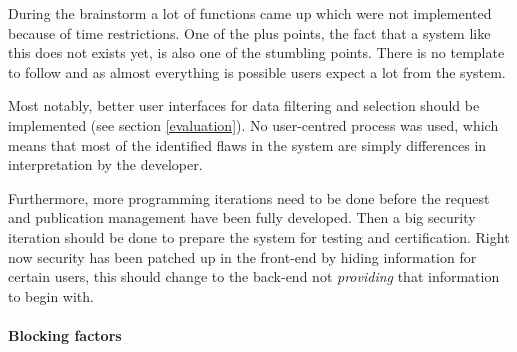 During the brainstorm a lot of functions came up which were not implemented because of time restrictions.
One of the plus points, the fact that a system like this does not exists yet, is also one of the stumbling points.
There is no template to follow and as almost everything is possible users expect a lot from the system.

Most notably, better user interfaces for data filtering and selection should be implemented (see section \ref{evaluation}).
No user-centred process was used, which means that most of the identified flaws in the system are simply differences in interpretation by the developer.

Furthermore, more programming iterations need to be done before the request and publication management have been fully developed.
Then a big security iteration should be done to prepare the system for testing and certification.
Right now security has been patched up in the front-end by hiding information for certain users, this should change to the back-end not \emph{providing} that information to begin with.


\paragraph{Blocking factors}



